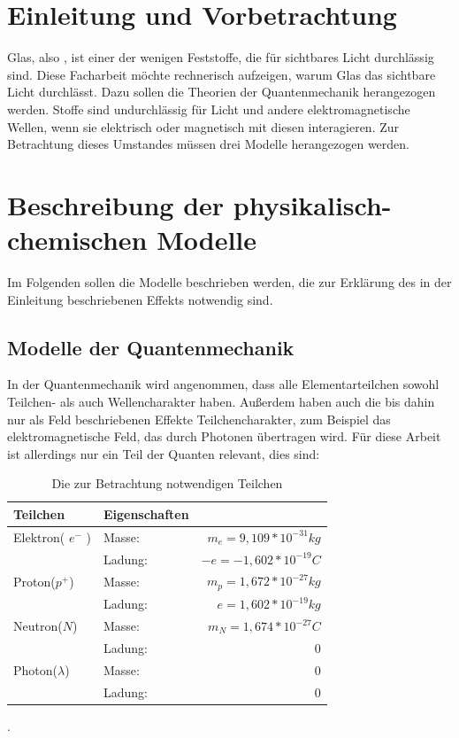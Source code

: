 \documentclass[11pt,a4paper,oneside]{report}
\begin{document}
\setcounter{page}{2}


\tableofcontents

\clearpage

\chapter{Einleitung und Vorbetrachtung}

Glas, also , ist einer der wenigen Feststoffe, die für sichtbares Licht durchlässig sind. Diese Facharbeit möchte rechnerisch aufzeigen, warum Glas das sichtbare Licht durchlässt. Dazu sollen die Theorien der Quantenmechanik herangezogen werden. Stoffe sind undurchlässig für Licht und andere elektromagnetische Wellen, wenn sie elektrisch oder magnetisch mit diesen interagieren. Zur Betrachtung dieses Umstandes müssen drei Modelle herangezogen werden\cite{pape99}.

\chapter{Beschreibung der physikalisch-chemischen Modelle}
Im Folgenden sollen die Modelle beschrieben werden, die zur Erklärung des in der Einleitung beschriebenen Effekts notwendig sind.

\section{Modelle der Quantenmechanik}
In der Quantenmechanik wird angenommen, dass alle Elementarteilchen sowohl Teilchen- als auch Wellencharakter haben. Außerdem haben auch die bis dahin nur als Feld beschriebenen Effekte Teilchencharakter, zum Beispiel das elektromagnetische Feld, das durch Photonen übertragen wird. Für diese Arbeit ist allerdings nur ein Teil der Quanten relevant, dies sind:
\begin{table}[ht]
\centering
\begin{tabular}{|l|lr|} \hline
Teilchen 				& Eigenschaften 	&  						\\  \hline
Elektron( $e^-$ ) 		& Masse: 			& $m_e=9,109*10^{-31}kg$	\\
					& Ladung: 		& $-e=-1,602*10^{-19}C$	\\ \hline
Proton($p^+$) 		& Masse: 			& $m_p=1,672*10^{-27}kg$ 	\\
 					& Ladung: 		& $e=1,602*10^{-19}kg$	\\ \hline 
Neutron($N$)			& Masse:			& $m_N=1,674*10^{-27}C$	\\ 
					& Ladung:		& $0$					\\ \hline
Photon($ \lambda $) 	& Masse: 			& $0$					\\ 
					&Ladung:			& $0$					\\ \hline
\end{tabular}
\caption{Die zur Betrachtung notwendigen Teilchen\cite[S. 433]{stroppe08}}.
\end{table}
\end{document}
